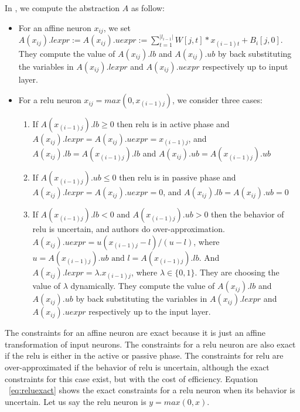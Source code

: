 In \deeppoly{}, we compute the abstraction $A$ as follow:
\begin{itemize}
\item For an affine neuron $x_{ij}$, we set 
  $A(x_{ij}).lexpr := A(x_{ij}).uexpr := \sum_{t=1}^{|l_{i-1}|} W[j,t]*x_{(i-1)t} + B_i[j,0]$.
  They compute the value of $A(x_{ij}).lb$ and $A(x_{ij}).ub$ by back substituting
  the variables in $A(x_{ij}).lexpr$ and $A(x_{ij}).uexpr$ respectively up to input layer.  
\item For a relu neuron $x_{ij} = max(0,x_{(i-1)j})$, we consider three cases:
            \begin{enumerate}
                \item If $A(x_{(i-1)j}).lb \geq 0$ then relu is in active phase and $A(x_{ij}).lexpr = A(x_{ij}).uexpr = x_{(i-1)j}$,
                        and $A(x_{ij}).lb = A(x_{(i-1)j}).lb$ and $A(x_{ij}).ub = A(x_{(i-1)j}).ub$
                \item If $A(x_{(i-1)j}).ub \leq 0$ then relu is in passive phase and $A(x_{ij}).lexpr = A(x_{ij}).uexpr = 0$, 
                        and $A(x_{ij}).lb = A(x_{ij}).ub = 0$
                \item  If $A(x_{(i-1)j}).lb < 0$ and $A(x_{(i-1)j}).ub > 0$ then the behavior of relu is uncertain, and authors
                        do over-approximation. $A(x_{ij}).uexpr = u(x_{(i-1)j} - l) / (u - l)$, 
                        where $u = A(x_{(i-1)j}).ub \text{ and } l = A(x_{(i-1)j}).lb$.
                        And $A(x_{ij}).lexpr = \lambda . x_{(i-1)j}$, where $\lambda \in \{0,1\}$. 
                        They are choosing the value of $\lambda$ dynamically. They compute the value of $A(x_{ij}).lb$ and $A(x_{ij}).ub$ 
                        by back substituting the variables in $A(x_{ij}).lexpr$ and $A(x_{ij}).uexpr$ respectively up to the input layer. 
            \end{enumerate} 
\end{itemize}

The constraints for an affine neuron are exact because it is just an affine transformation of input neurons. 
The constraints for a relu neuron are also exact if the relu is either in the active or passive phase. 
The constraints for relu are over-approximated if the behavior of relu is uncertain, although the exact 
constraints for this case exist, but with the cost of efficiency. 
Equation ~\ref{eq:reluexact} shows the exact constraints
for a relu neuron when its behavior is uncertain. Let us say the relu neuron is $y = max(0,x)$. 

